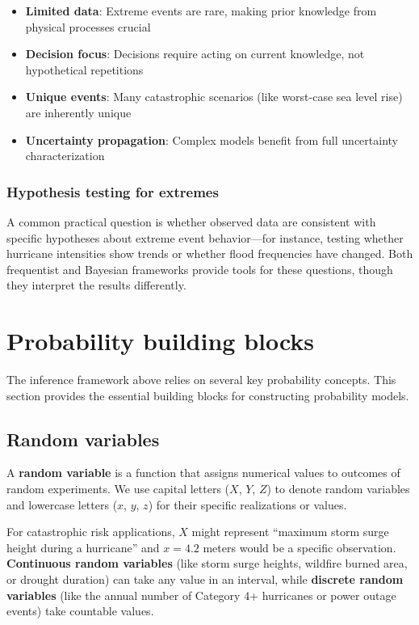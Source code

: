 \documentclass[
  letterpaper,
  DIV=11,
  numbers=noendperiod]{scrreprt}
\providecommand{\tightlist}{%
  \setlength{\itemsep}{0pt}\setlength{\parskip}{0pt}}
\begin{document}
\begin{itemize}
\tightlist
\item
  \textbf{Limited data}: Extreme events are rare, making prior knowledge
  from physical processes crucial
\item
  \textbf{Decision focus}: Decisions require acting on current
  knowledge, not hypothetical repetitions
\item
  \textbf{Unique events}: Many catastrophic scenarios (like worst-case
  sea level rise) are inherently unique
\item
  \textbf{Uncertainty propagation}: Complex models benefit from full
  uncertainty characterization
\end{itemize}

\subsubsection{Hypothesis testing for
extremes}\label{hypothesis-testing-for-extremes}

A common practical question is whether observed data are consistent with
specific hypotheses about extreme event behavior---for instance, testing
whether hurricane intensities show trends or whether flood frequencies
have changed. Both frequentist and Bayesian frameworks provide tools for
these questions, though they interpret the results differently.

\section{Probability building blocks}\label{probability-building-blocks}

The inference framework above relies on several key probability
concepts. This section provides the essential building blocks for
constructing probability models.

\subsection{Random variables}\label{random-variables}

A \textbf{random variable} is a function that assigns numerical values
to outcomes of random experiments. We use capital letters (\(X\), \(Y\),
\(Z\)) to denote random variables and lowercase letters (\(x\), \(y\),
\(z\)) for their specific realizations or values.

For catastrophic risk applications, \(X\) might represent ``maximum
storm surge height during a hurricane'' and \(x = 4.2\) meters would be
a specific observation. \textbf{Continuous random variables} (like storm
surge heights, wildfire burned area, or drought duration) can take any
value in an interval, while \textbf{discrete random variables} (like the
annual number of Category 4+ hurricanes or power outage events) take
countable values.
\end{document}
